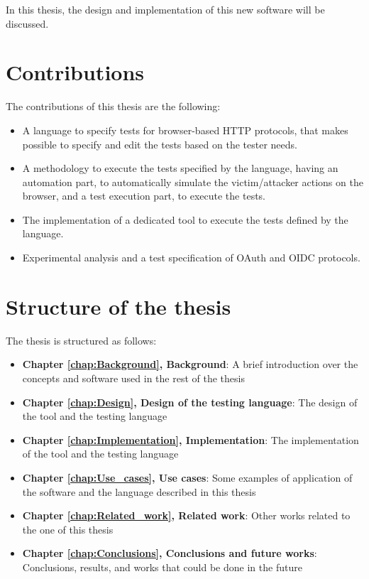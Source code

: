 In this thesis, the design and implementation of this new software will be discussed.

\section{Contributions}
\label{sec:contributions}
The contributions of this thesis are the following:
\begin{itemize}
    \item A language to specify tests for browser-based HTTP protocols, that makes possible to specify and edit the tests based on the tester needs.
    \item A methodology to execute the tests specified by the language, having an automation part, to automatically simulate the victim/attacker actions on the browser, and a test execution part, to execute the tests.
    \item The implementation of a dedicated tool to execute the tests defined by the language.
    \item Experimental analysis and a test specification of \gls{OAuth} and \gls{OIDC} protocols.
\end{itemize}

\section{Structure of the thesis}
The thesis is structured as follows:
\begin{itemize}
    \item \textbf{Chapter \ref{chap:Background}, Background}: A brief introduction over the concepts and software used in the rest of the thesis
    \item \textbf{Chapter \ref{chap:Design}, Design of the testing language}: The design of the tool and the testing language
    \item \textbf{Chapter \ref{chap:Implementation}, Implementation}: The implementation of the tool and the testing language
    \item \textbf{Chapter \ref{chap:Use_cases}, Use cases}: Some examples of application of the software and the language described in this thesis
    \item \textbf{Chapter \ref{chap:Related_work}, Related work}: Other works related to the one of this thesis
    \item \textbf{Chapter \ref{chap:Conclusions}, Conclusions and future works}: Conclusions, results, and works that could be done in the future
\end{itemize}




